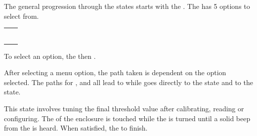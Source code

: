  \par\medskip

The general progression through the states starts with the .  The
 has \num{5} options to select from.

\begin{table}[H]
\centering
\begin{tabu}{c c}
   &  \\ \mrule
   &  \\
   &  \\
   &  \\
   &  \\
   & 
\end{tabu}
\end{table}

To select an option,  the  then .


After selecting a menu option, the path taken is dependent on the option
selected.  The paths for ,  and  all lead to
 while  goes directly to the  state and  to
the  state.


 \par\medskip

This state involves tuning the final threshold value after calibrating, reading
or configuring.  The  of the enclosure is touched while the  is
turned until a solid beep from the  is heard.  When satisfied, 
the  to finish.

